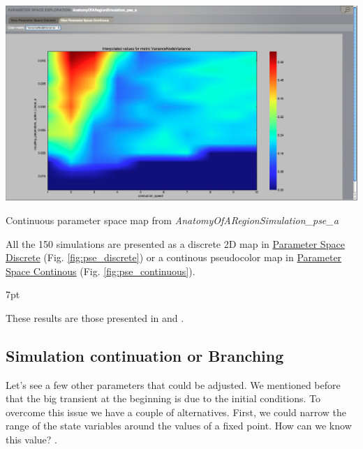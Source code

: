 \documentclass{tufte-handout}
\newenvironment{blah}{%
  \def\FrameCommand{%
    \hspace{1pt}%
    {\color{DarkOrange}\vrule width 2pt}%
    {\color{PeachPuff}\vrule width 4pt}%
    \colorbox{PeachPuff}%
  }%
  \MakeFramed{\advance\hsize-\width\FrameRestore}%
  \noindent\hspace{-4.55pt}%
  \begin{adjustwidth}{}{7pt}%
  \vspace{2pt}\vspace{2pt}%
}
{%
  \vspace{2pt}\end{adjustwidth}\endMakeFramed%
}
\begin{document}
\begin{marginfigure}
  \includegraphics[width=\linewidth]{Handout_UI_BuildingYourOwnBrainNetworkModel_PSEContinuous}%
  \caption{Continuous parameter space map from \textit{AnatomyOfARegionSimulation\_pse\_a}}%
  \label{fig:pse_continuous}%
\end{marginfigure}

All the 150 simulations are presented as a discrete 2D map in \underline{Parameter Space Discrete}  (Fig. \ref{fig:pse_discrete}) or a continous pseudocolor map in \underline{Parameter Space Continous} (Fig. \ref{fig:pse_continuous}). 




\begin{blah}
 These results are those presented in \citep{Ghosh_2008} and \citep{Knock_2009}. 
\end{blah}

\subsection{Simulation continuation or Branching}\label{sec:results}

Let's see a few other parameters that could be adjusted. We mentioned before
that the big transient at the beginning is due to the initial conditions. To
overcome this issue we have a couple of alternatives. First, we could narrow the range of the state variables around the values of a fixed point. How can we know this value? .
\end{document}
